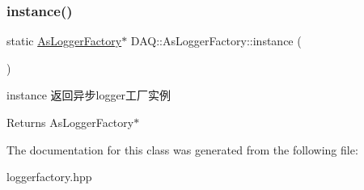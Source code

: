 \subsubsection{\texorpdfstring{instance()}{instance()}}
{\footnotesize\ttfamily static \hyperlink{classDAQ_1_1AsLoggerFactory}{As\+Logger\+Factory}$\ast$ D\+A\+Q\+::\+As\+Logger\+Factory\+::instance (\begin{DoxyParamCaption}{ }\end{DoxyParamCaption})\hspace{0.3cm}{\ttfamily [static]}}



instance 返回异步logger工厂实例 

\begin{DoxyReturn}{Returns}
As\+Logger\+Factory$\ast$ 
\end{DoxyReturn}


The documentation for this class was generated from the following file\+:\begin{DoxyCompactItemize}
\item 
loggerfactory.\+hpp\end{DoxyCompactItemize}
